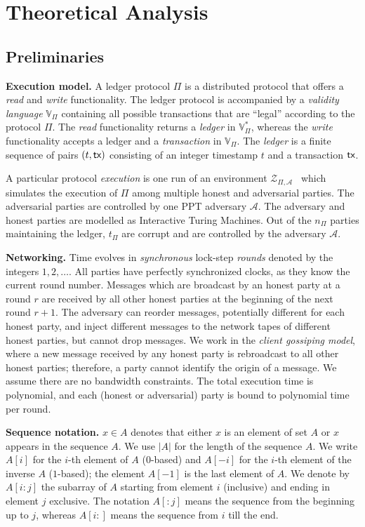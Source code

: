 \section{Theoretical Analysis}

\subsection{Preliminaries}
\noindent
\textbf{Execution model.}
A ledger protocol $\Pi$ is a distributed protocol that offers
a \emph{read} and \emph{write} functionality.
The ledger protocol is accompanied by a \emph{validity language}
$\mathbb{V}_{\Pi}$ containing all possible transactions that are ``legal''
according to the protocol $\Pi$.
The
\emph{read} functionality returns a \emph{ledger} in $\mathbb{V}_{\Pi}^*$,
whereas the \emph{write} functionality accepts a ledger and a \emph{transaction} in $\mathbb{V}_\Pi$.
The \emph{ledger} is a finite sequence of pairs $(t, \textsf{tx})$ consisting
of an integer timestamp $t$ and a transaction $\textsf{tx}$.

A particular protocol \emph{execution}
is one run of an environment $\mathcal{Z}_{\Pi,\mathcal{A}}$~\cite{FOCS:Canetti01} which simulates
the execution of $\Pi$ among multiple honest and adversarial parties. The adversarial
parties are controlled by one PPT adversary $\mathcal{A}$. The adversary and honest
parties are modelled as Interactive Turing Machines.
Out of the
$n_\Pi$ parties maintaining the ledger, $t_\Pi$ are corrupt and are controlled by the adversary
$\mathcal{A}$.

\noindent
\textbf{Networking.}
Time evolves in \emph{synchronous} lock-step \emph{rounds} denoted by the integers $1, 2,
\ldots$. All parties have perfectly synchronized clocks, as they know the current round number.
Messages which are broadcast by an honest party at a round $r$ are received by all
other honest parties at the beginning of the next round $r + 1$. The adversary
can reorder messages, potentially different for each honest party, and
inject different messages to the network tapes of different honest parties,
but cannot drop messages. We work in the \emph{client gossiping model}, where
a new message received by any honest party is rebroadcast to all other honest
parties; therefore, a party cannot identify the origin of a message. We assume there are no bandwidth constraints.
The total execution time is polynomial, and each (honest or adversarial)
party is bound to polynomial time per round.

\noindent
\textbf{Sequence notation.}
$x \in A$ denotes that either $x$ is an element of set $A$ or $x$
appears in the sequence $A$. We use $|A|$ for the length of the sequence $A$.
We write $A[i]$ for the $i$-th element of $A$ ($0$-based) and $A[-i]$ for the
$i$-th element of the inverse $A$ ($1$-based); the element $A[-1]$ is the last element of $A$.
We denote by $A[{i}{:}{j}]$ the subarray of $A$ starting from element $i$ (inclusive)
and ending in element $j$ exclusive. The notation $A[{:}j]$ means the sequence
from the beginning up to $j$, whereas $A[i{:}]$ means the sequence from $i$ till
the end.

